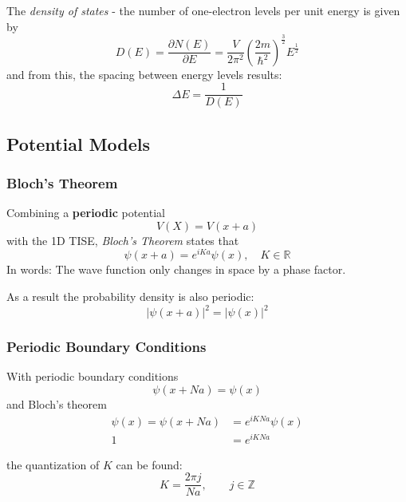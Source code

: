 The \textit{density of states} - the number of one-electron levels per unit energy is given by
\noindent\begin{equation*}
    D(E)=\frac{\partial N(E)}{\partial E} = \frac{V}{2\pi^2}{\left(\frac{2m}{\hbar^2}\right)}^{\frac{3}{2}} E^{\frac{1}{2}}
\end{equation*}
and from this, the spacing between energy levels results:
\noindent\begin{equation*}
    \Delta E = \frac{1}{D(E)}
\end{equation*}

\subsection{Potential Models}
\subsubsection{Bloch's Theorem}
Combining a \textbf{periodic} potential
\noindent\begin{equation*}
    V(X) = V(x+a)
\end{equation*}
with the 1D TISE, \textit{Bloch's Theorem} states that
\noindent\begin{equation*}
    \psi(x+a) = e^{iKa} \psi(x), \quad K\in \mathbb{R}
\end{equation*}
In words: The wave function only changes in space by a phase factor.

\newpar{}
As a result the probability density is also periodic:
\noindent\begin{equation*}
    {|\psi(x+a)|}^2={|\psi(x)|}^2
\end{equation*}

\subsubsection{Periodic Boundary Conditions}
With periodic boundary conditions
\noindent\begin{equation*}
    \psi(x+Na) = \psi(x)
\end{equation*}
and Bloch's theorem
\noindent\begin{align*}
    \psi(x) = \psi(x+Na) & = e^{iKNa}\psi(x) \\
    1                    & =e^{iKNa}
\end{align*}

the quantization of $K$ can be found:
\noindent\begin{equation*}
    K=\frac{2\pi j}{Na}, \qquad j\in \mathbb{Z}
\end{equation*}

